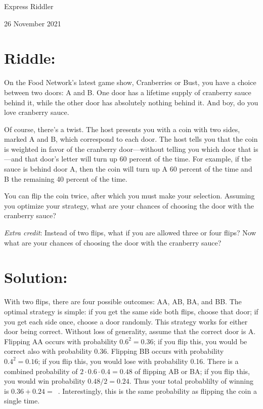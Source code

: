 \documentclass{article}
\begin{document}
\pagestyle{empty} %

\begin{center}
{\LARGE Express Riddler}

\vspace{0.15in}

{\Large 26 November 2021}
\end{center}


\section*{Riddle:}

On the Food Network's latest game show, Cranberries or Bust, you have a choice between two doors: A and B.
One door has a lifetime supply of cranberry sauce behind it, while the other door has absolutely nothing behind it.
And boy, do you love cranberry sauce.

Of course, there's a twist.
The host presents you with a coin with two sides, marked A and B, which correspond to each door.
The host tells you that the coin is weighted in favor of the cranberry door---without telling you which door that is---and that door's letter will turn up 60 percent of the time.
For example, if the sauce is behind door A, then the coin will turn up A 60 percent of the time and B the remaining 40 percent of the time.

You can flip the coin twice, after which you must make your selection.
Assuming you optimize your strategy, what are your chances of choosing the door with the cranberry sauce?

\textit{Extra credit}: Instead of two flips, what if you are allowed three or four flips?
Now what are your chances of choosing the door with the cranberry sauce?


\section*{Solution:}

With two flips, there are four possible outcomes: AA, AB, BA, and BB.
The optimal strategy is simple: if you get the same side both flips, choose that door; if you get each side once, choose a door randomly.
This strategy works for either door being correct.
Without loss of generality, assume that the correct door is A.
Flipping AA occurs with probability $0.6^{2}=0.36$; if you flip this, you would be correct also with probability 0.36.
Flipping BB occurs with probability $0.4^{2}=0.16$; if you flip this, you would lose with probability 0.16.
There is a combined probability of $2\cdot0.6\cdot0.4=0.48$ of flipping AB or BA; if you flip this, you would win probability $0.48/2=0.24$.
Thus your total probablilty of winning is $0.36+0.24=$
\,.
Interestingly, this is the same probability as flipping the coin a single time.
\end{document}
